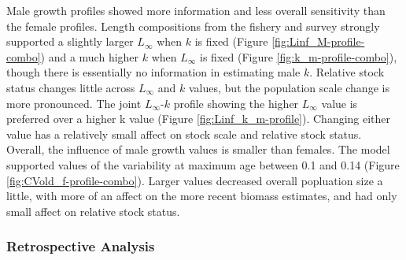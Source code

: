 \documentclass[11pt,
  english,
  a4paper,
]{article}
\begin{document}
Male growth profiles showed more information and less overall sensitivity than the female profiles. Length compositions from the fishery and survey strongly supported a slightly larger {\(L_{\infty}\)\leavevmode\tagmcend\tagstructend} when {\(k\)\leavevmode\tagmcend\tagstructend} is fixed (Figure \ref{fig:Linf_M-profile-combo}) and a much higher {\(k\)\leavevmode\tagmcend\tagstructend} when {\(L_{\infty}\)\leavevmode\tagmcend\tagstructend} is fixed (Figure \ref{fig:k_m-profile-combo}), though there is essentially no information in estimating male {\(k\)\leavevmode\tagmcend\tagstructend}. Relative stock status changes little across {\(L_{\infty}\)\leavevmode\tagmcend\tagstructend} and {\(k\)\leavevmode\tagmcend\tagstructend} values, but the population scale change is more pronounced. The joint {\(L_{\infty}\)\leavevmode\tagmcend\tagstructend}-{\(k\)\leavevmode\tagmcend\tagstructend} profile showing the higher {\(L_{\infty}\)\leavevmode\tagmcend\tagstructend} value is preferred over a higher k value (Figure \ref{fig:Linf_k_m-profile}). Changing either value has a relatively small affect on stock scale and relative stock status. Overall, the influence of male growth values is smaller than females. The model supported values of the variability at maximum age between 0.1 and 0.14 (Figure \ref{fig:CVold_f-profile-combo}). Larger values decreased overall popluation size a little, with more of an affect on the more recent biomass estimates, and had only small affect on relative stock status.

\leavevmode\tagmcend\tagstructend\par


\hypertarget{retrospective-analysis}{%
\subsubsection{Retrospective Analysis}\label{retrospective-analysis}}

\leavevmode\tagmcend\tagstructend
\end{document}
